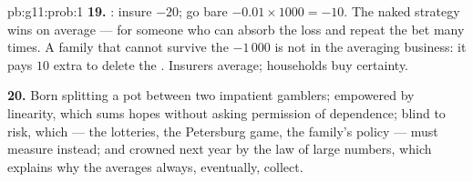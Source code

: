 \begin{solution}{pb:g11:prob:1}
\textbf{19.} : insure $-20$; go bare
$-0.01 \times 1000 = -10$. The naked strategy wins on average
--- for someone who can absorb the loss and repeat the bet
many times. A family that cannot survive the $-1\,000$ is not
in the averaging business: it pays $10$ extra to delete the
. Insurers average; households buy certainty.

\textbf{20.} Born splitting a pot between two impatient
gamblers; empowered by linearity, which sums hopes without
asking permission of dependence; blind to risk, which 
--- the lotteries, the Petersburg game, the family's policy
--- must measure instead; and crowned next year by the law of
large numbers, which explains why the averages always,
eventually, collect.
\end{solution}
